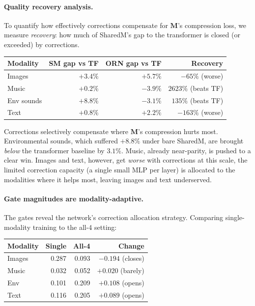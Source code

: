 \documentclass[11pt, a4paper]{article}
\newcommand{\M}{\mathbf{M}}
\theoremstyle{plain}
\theoremstyle{remark}
\begin{document}
\paragraph{Quality recovery analysis.}
To quantify how effectively corrections compensate for $\M$'s compression loss, we measure \emph{recovery}: how much of SharedM's gap to the transformer is closed (or exceeded) by corrections.

\begin{center}\small
\begin{tabular}{@{}lrrr@{}}
\toprule
\textbf{Modality} & \textbf{SM gap vs TF} & \textbf{ORN gap vs TF} & \textbf{Recovery} \\
\midrule
Images        & $+3.4\%$  & $+5.7\%$  & $-65\%$ (worse) \\
Music         & $+0.2\%$  & $-3.9\%$  & $2623\%$ (beats TF) \\
Env sounds    & $+8.8\%$  & $-3.1\%$  & $135\%$ (beats TF) \\
Text          & $+0.8\%$  & $+2.2\%$  & $-163\%$ (worse) \\
\bottomrule
\end{tabular}
\end{center}

Corrections selectively compensate where $\M$'s compression hurts most.
Environmental sounds, which suffered $+8.8\%$ under bare SharedM, are brought \emph{below} the transformer baseline by $3.1\%$.
Music, already near-parity, is pushed to a clear win.
Images and text, however, get \emph{worse} with corrections at this scale, the limited correction capacity (a single small MLP per layer) is allocated to the modalities where it helps most, leaving images and text underserved.

\paragraph{Gate magnitudes are modality-adaptive.}
The gates reveal the network's correction allocation strategy.
Comparing single-modality training to the all-4 setting:

\begin{center}\small
\begin{tabular}{@{}lrrr@{}}
\toprule
\textbf{Modality} & \textbf{Single} & \textbf{All-4} & \textbf{Change} \\
\midrule
Images  & 0.287 & 0.093 & $-0.194$ (closes) \\
Music   & 0.032 & 0.052 & $+0.020$ (barely) \\
Env     & 0.101 & 0.209 & $+0.108$ (opens) \\
Text    & 0.116 & 0.205 & $+0.089$ (opens) \\
\bottomrule
\end{tabular}
\end{center}
\end{document}
